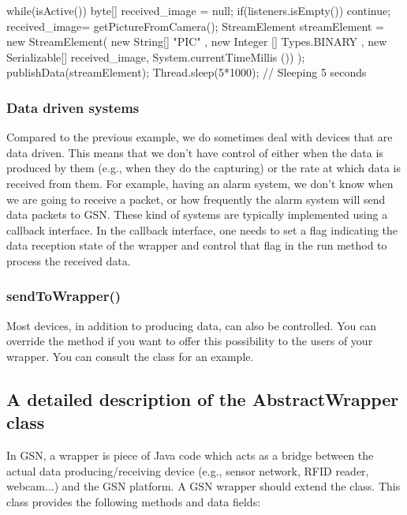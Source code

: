 \begin{javacode}
	while(isActive()) {
		byte[] received_image = null;
		if(listeners.isEmpty())
			continue;
		received_image= getPictureFromCamera();
		StreamElement streamElement = new StreamElement(
			new String[] { "PIC" },
			new Integer [] { Types.BINARY },
			new Serializable[] {received_image},
			System.currentTimeMillis ())
		);
		publishData(streamElement);
		Thread.sleep(5*1000); // Sleeping 5 seconds
	}
\end{javacode}

\subsubsection{Data driven systems}
Compared to the previous example, we do sometimes deal with devices that are
data driven. This means that we don't have control of either when the data is
produced by them (e.g., when they do the capturing) or the rate at which
data is received from them.
For example, having an alarm system, we don't know when we
are going to receive a packet, or how frequently the alarm system will send
data packets to GSN. These kind of systems are typically implemented using a
callback interface. In the callback interface, one needs to set a flag indicating
the data reception state of the wrapper and control that flag in the run method
to process the received data.

\subsubsection{sendToWrapper()}
Most devices, in addition to producing data, can also be controlled. You can
override the method
if you want to offer this possibility to the users of your wrapper.
You can consult the  class for an
example.

\subsection{A detailed description of the AbstractWrapper class}
In GSN, a wrapper is piece of Java code which acts as a bridge between the actual
data producing/receiving device (e.g., sensor network, RFID reader, webcam...)
and the GSN platform. A GSN wrapper should extend the 
class. This class provides the following methods and data fields:


